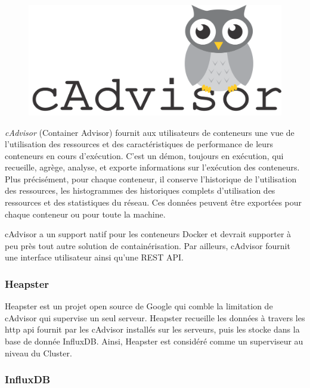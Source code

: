 \begin{onehalfspace}
\begin{figure}
\centering
\includegraphics[scale=0.2]{chapitre5/assets/cadvisor}
\end{figure}
\noindent \emph{cAdvisor} (Container Advisor) fournit aux utilisateurs de conteneurs une vue de l'utilisation des ressources et des caractéristiques de performance de leurs conteneurs en cours d'exécution. C'est un démon, toujours en exécution, qui recueille, agrège, analyse, et exporte informations sur l'exécution des conteneurs. Plus précisément, pour chaque conteneur, il conserve l'historique de l'utilisation des ressources, les histogrammes des historiques complets d'utilisation des ressources et des statistiques du réseau. Ces données peuvent être exportées pour chaque conteneur ou pour toute la machine.

cAdvisor a un support natif pour les conteneurs Docker et devrait supporter à peu près tout autre solution de containérisation. Par ailleurs, cAdvisor fournit une interface utilisateur ainsi qu'une REST API.


\subsubsection*{Heapster}

Heapster est un projet open source de Google qui comble la limitation de cAdvisor qui supervise un seul serveur. Heapster recueille les données à travers les \acrshort{http} \acrshort{api} fournit par les cAdvisor installés sur les serveurs, puis les stocke dans la base de donnée InfluxDB. Ainsi, Heapster est considéré comme un superviseur au niveau du Cluster.

\subsubsection*{InfluxDB}


\end{onehalfspace}
